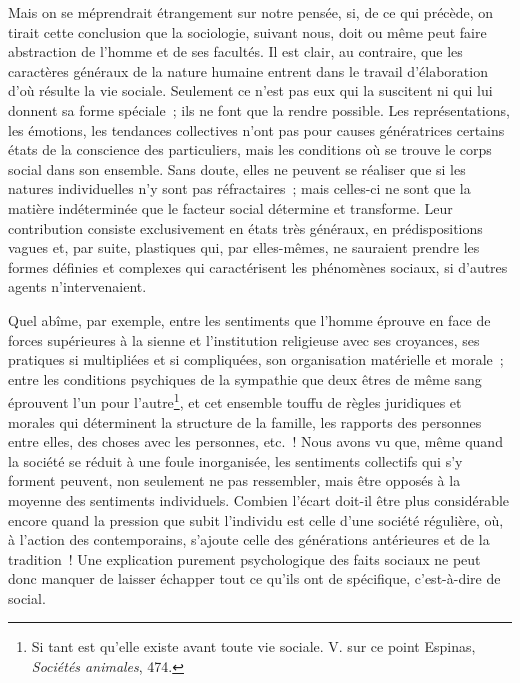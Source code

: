 \documentclass[french,twoside]{book} %
\begin{document}
Mais on se méprendrait étrangement sur notre pensée, si, de ce qui précède, on tirait cette conclusion que la sociologie, suivant nous, doit ou même peut faire abstraction de l’homme et de ses facultés. Il est clair, au contraire, que les caractères généraux de la nature humaine entrent dans le travail d’élaboration d’où résulte la vie sociale. Seulement ce n’est pas eux qui la suscitent ni qui lui donnent sa forme spéciale ; ils ne font que la rendre possible. Les représentations, les émotions, les tendances collectives n’ont pas pour causes génératrices certains états de la conscience des particuliers, mais les conditions où se trouve le corps social dans son ensemble. Sans doute, elles ne peuvent se réaliser que si les natures individuelles n’y sont pas réfractaires ; mais celles-ci ne sont que la matière indéterminée que le facteur social détermine et transforme. Leur contribution consiste exclusivement en états très généraux, en prédispositions vagues et, par suite, plastiques qui, par elles-mêmes, ne sauraient prendre les formes définies et complexes qui caractérisent les phénomènes sociaux, si d’autres agents n’intervenaient.\par
Quel abîme, par exemple, entre les sentiments que l’homme éprouve en face de forces supérieures à la sienne et l’institution religieuse avec ses croyances, ses pratiques si multipliées et si compliquées, son organisation matérielle et morale ; entre les conditions psychiques de la sympathie que deux êtres de même sang éprouvent l’un pour l’autre\footnote{ Si tant est qu’elle existe avant toute vie sociale. V. sur ce point Espinas, \emph{Sociétés animales}, 474.}, et cet ensemble touffu de règles juridiques et morales qui déterminent la structure de la famille, les rapports des personnes entre elles, des choses avec les personnes, etc. ! Nous avons vu que, même quand la société se réduit à une foule inorganisée, les sentiments collectifs qui s’y forment peuvent, non seulement ne pas ressembler, mais être opposés à la moyenne des sentiments individuels. Combien l’écart doit-il être plus considérable encore quand la pression que subit l’individu est celle d’une société régulière, où, à l’action des contemporains, s’ajoute celle des générations antérieures et de la tradition ! Une explication purement psychologique des faits sociaux ne peut donc manquer de laisser échapper tout ce qu’ils ont de spécifique, c’est-à-dire de social.\par
\end{document}
